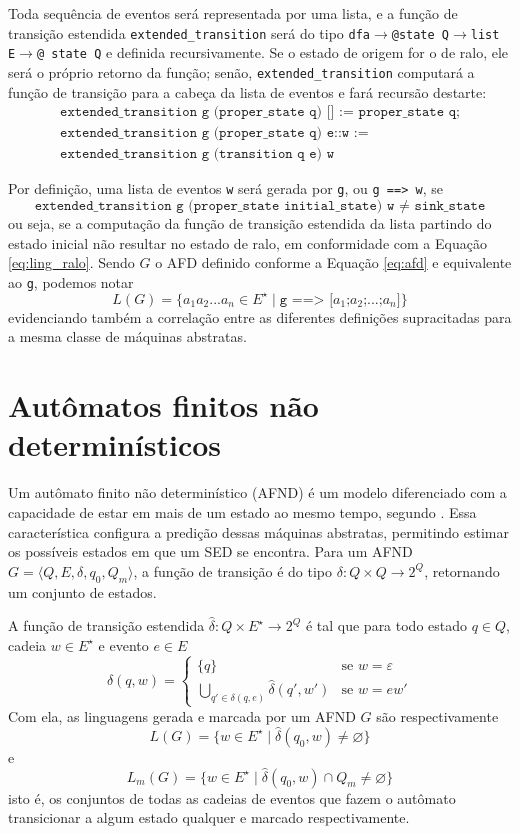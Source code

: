 Toda sequência de eventos será representada por uma lista, e a função de transição estendida \texttt{extended\_transition} será do tipo \texttt{dfa$\to$@state Q$\to$list E$\to$@ state Q} e definida recursivamente. Se o estado de origem for o de ralo, ele será o próprio retorno da função; senão, \texttt{extended\_transition} computará a função de transição para a cabeça da lista de eventos e fará recursão destarte: \begin{gather*}
\texttt{extended\_transition g (proper\_state q) [] := proper\_state q;}\\\texttt{extended\_transition g (proper\_state q) e::w :=}\\\texttt{extended\_transition g (transition q e) w}\end{gather*}

Por definição, uma lista de eventos \texttt{w} será gerada por \texttt{g}, ou \texttt{g ==> w}, se $$\texttt{extended\_transition g (proper\_state initial\_state) w $\neq$ sink\_state}$$ ou seja, se a computação da função de transição estendida da lista partindo do estado inicial não resultar no estado de ralo, em conformidade com a Equação \ref{eq:ling_ralo}. Sendo $G$ o AFD definido conforme a Equação \ref{eq:afd} e equivalente ao \texttt{g}, podemos notar $$L(G) = \{ a_1a_2...a_n \in E^\star \mid \texttt{g ==> [$a_1$;$a_2$;$...$;$a_n$]} \}$$ evidenciando também a correlação entre as diferentes definições supracitadas para a mesma classe de máquinas abstratas.

\section{Autômatos finitos não determinísticos}

Um autômato finito não determinístico (\acs{AFND}) é um modelo diferenciado com a capacidade de estar em mais de um estado ao mesmo tempo, segundo . Essa característica configura a predição dessas máquinas abstratas, permitindo estimar os possíveis estados em que um SED se encontra. Para um AFND $G = \langle Q, E, \delta, q_0, Q_m \rangle$, a função de transição é do tipo $\delta : Q \times Q \to 2^Q$, retornando um conjunto de estados.

A função de transição estendida $\hat{\delta} : Q \times E^\star \to 2^Q$ é tal que para todo estado $q \in Q$, cadeia $w \in E^\star$ e evento $e \in E$ $$\hat{\delta}(q, w) = \begin{cases}
\{ q \} & \text{se $w = \varepsilon$}\\
\displaystyle\bigcup_{q' \in \delta(q, e)} \hat{\delta}(q', w') & \text{se $w = ew'$}
\end{cases}$$ Com ela, as linguagens gerada e marcada por um AFND $G$ são respectivamente $$L(G) = \{ w \in E^\star \mid \hat{\delta}(q_0, w) \neq \varnothing \}$$ e $$L_m(G) = \{ w \in E^\star \mid \hat{\delta}(q_0, w) \cap Q_m \neq \varnothing \}$$ isto é, os conjuntos de todas as cadeias de eventos que fazem o autômato transicionar a algum estado qualquer e marcado respectivamente.

